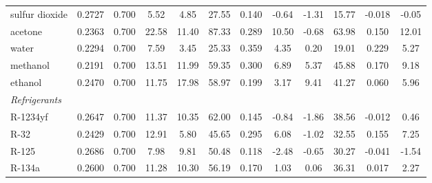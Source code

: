 \begin{table}[H]
\begin{tabular}{lccccccccccc}
sulfur dioxide & 0.2727 & 0.700 & 5.52 & 4.85 & 27.55 & 0.140 & -0.64 & -1.31 & 15.77 & -0.018 & -0.05 \\
acetone & 0.2363 & 0.700 & 22.58 & 11.40 & 87.33 & 0.289 & 10.50 & -0.68 & 63.98 & 0.150 & 12.01 \\
water & 0.2294 & 0.700 & 7.59 & 3.45 & 25.33 & 0.359 & 4.35 & 0.20 & 19.01 & 0.229 & 5.27 \\
methanol & 0.2191 & 0.700 & 13.51 & 11.99 & 59.35 & 0.300 & 6.89 & 5.37 & 45.88 & 0.170 & 9.18 \\
ethanol & 0.2470 & 0.700 & 11.75 & 17.98 & 58.97 & 0.199 & 3.17 & 9.41 & 41.27 & 0.060 & 5.96 \\
\multicolumn{12}{l}{\emph{Refrigerants}} \\
R-1234yf & 0.2647 & 0.700 & 11.37 & 10.35 & 62.00 & 0.145 & -0.84 & -1.86 & 38.56 & -0.012 & 0.46 \\
R-32 & 0.2429 & 0.700 & 12.91 & 5.80 & 45.65 & 0.295 & 6.08 & -1.02 & 32.55 & 0.155 & 7.25 \\
R-125 & 0.2686 & 0.700 & 7.98 & 9.81 & 50.48 & 0.118 & -2.48 & -0.65 & 30.27 & -0.041 & -1.54 \\
R-134a & 0.2600 & 0.700 & 11.28 & 10.30 & 56.19 & 0.170 & 1.03 & 0.06 & 36.31 & 0.017 & 2.27 \\
\bottomrule
\end{tabular}
\end{table}
